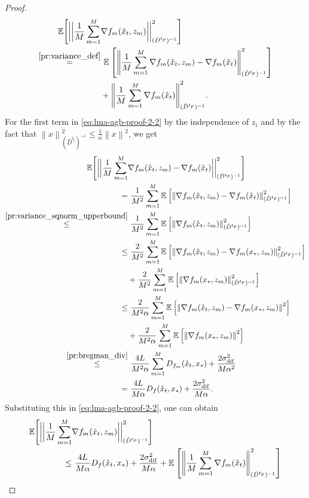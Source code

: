 \documentclass[sn-mathphys,Numbered]{sn-jnl}%
\renewcommand{\|}{\parallel}
\newcommand\ec[2][]{\ensuremath{\mathbb{E}_{#1} \left[#2\right]}}
\newcommand\ecn[3][]{\ec[#1]{\norm{#2}^2_{#3}}}
\newcommand{\norm}[1]{\left\lVert#1\right\rVert}
\newcommand{\sqn}[1]{{\left\lVert#1\right\rVert}^2}
\newcommand{\sigmaf}{\sigma_{\mathrm{dif}}}
\renewcommand {\*} {\ast}
\begin{document}
\begin{proof}
    \begin{align}
        \label{eq:lma-agb-proof-2-2}
            \mathbb{E}\Bigg[ \bigg{|} \bigg{|} \frac{1}{M} \sum_{m=1}^{M} &\nabla f_m (\hat{x}_t, z_m) \bigg{|} \bigg{|}^2_{(\hat{D}^{t_p})^{-1}}\Bigg] \nonumber \\ \overset{\eqref{pr:variance_def}}{=}&\ \ecn{ \frac{1}{M} \sum_{m=1}^{M} \nabla f_m (\hat{x}_t, z_m) - \nabla f_m (\hat{x}_t)}{(\hat{D}^{t_p})^{-1}} \nonumber \\
            &+ \sqn{ \frac{1}{M} \sum_{m=1}^{M} \nabla f_m (\hat{x}_t)}_{(\hat{D}^{t_p})^{-1}}.
    \end{align}
For the first term in \eqref{eq:lma-agb-proof-2-2} by the independence of $z_i$ and by the fact that $\sqn{x}_{(\hat{D}^{t_p})^{-1}} \leq \frac{1}{\alpha}\sqn{x}$, we get
    \begin{align*}
        \mathbb{E}\Bigg[ \bigg{|} \bigg{|} \frac{1}{M} \sum_{m=1}^{M} &\nabla f_m (\hat{x}_t, z_m) - \nabla f_m (\hat{x}_t)\bigg{|} \bigg{|}^2_{(\hat{D}^{t_p})^{-1}}\Bigg]  \\ =&\ \frac{1}{M^2} \sum_{m=1}^{M} \ecn{\nabla f_m (\hat{x}_t, z_m) - \nabla f_m (\hat{x}_t)}{(\hat{D}^{t_p})^{-1}} \\
        \overset{\eqref{pr:variance_sqnorm_upperbound}}{\leq}&\ \frac{1}{M^2} \sum_{m=1}^{M} \ecn{\nabla f_m (\hat{x}_t, z_m)}{(\hat{D}^{t_p})^{-1}} \\
        {\leq}&\ \frac{2}{M^2} \sum_{m=1}^{M} \ecn{\nabla f_m (\hat{x}_t, z_m) - \nabla f_m (x_\ast, z_m)}{(\hat{D}^{t_p})^{-1}} \\ &+ \frac{2}{M^2} \sum_{m=1}^{M} \ecn{\nabla f_m (x_\ast, z_m)}{(\hat{D}^{t_p})^{-1}} \\
        {\leq}&\ \frac{2}{M^2\alpha} \sum_{m=1}^{M} \ecn{\nabla f_m (\hat{x}_t, z_m) - \nabla f_m (x_\ast, z_m)}{} \\ &+ \frac{2}{M^2\alpha} \sum_{m=1}^{M} \ecn{\nabla f_m (x_\ast, z_m)}{} \\
        \overset{\eqref{pr:bregman_div}}{\leq}&\ \frac{4 L}{M^2 \alpha} \sum_{m=1}^{M} D_{f_m} (\hat{x}_t, x_\ast) + \frac{2 \sigmaf^2}{M\alpha^2}\\
        =&\ \frac{4L}{M\alpha} D_{f} (\hat{x}_t, x_\ast) + \frac{2 \sigmaf^2}{M\alpha}.
    \end{align*}
    Substituting this in \eqref{eq:lma-agb-proof-2-2}, one can obtain
    \begin{align}
        \label{eq:important-but-not}
          \mathbb{E}\Bigg[ \bigg{|} \bigg{|}  \frac{1}{M} \sum_{m=1}^{M} &\nabla f_m (\hat{x}_t, z_m) \bigg{|} \bigg{|}^2_{(\hat{D}^{t_p})^{-1}}\Bigg] \nonumber \\ \leq&\ \frac{4L}{M\alpha} D_{f} (\hat{x}_t, x_\ast) + \frac{2 \sigmaf^2}{M\alpha} + \ecn{ \frac{1}{M} \sum_{m=1}^{M}  \nabla f_m (\hat{x}_t)}{(\hat{D}^{t_p})^{-1}} \nonumber \\

\end{align}
\end{proof}
\end{document}
